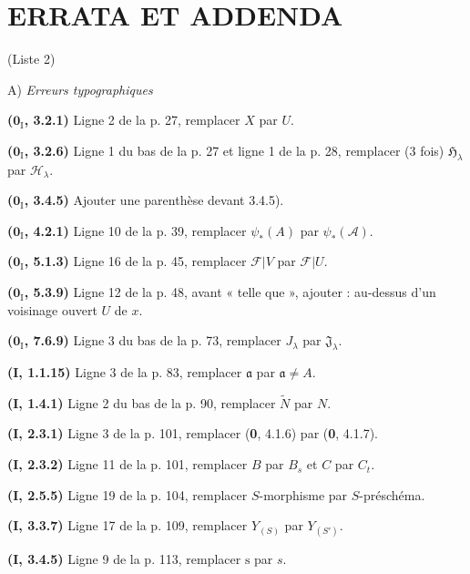 \clearpage
{}
\thispagestyle{empty}
\null
\clearpage

\section*{ERRATA ET ADDENDA}
\begin{center}
(Liste 2)

\medskip
A) \emph{Erreurs typographiques}
\end{center}

\noindent\textbf{($\mathbf{0}_{\mathrm I}$, 3.2.1)} Ligne 2 de la p. 27, remplacer $X$
par $U$.

\noindent\textbf{($\mathbf{0}_{\mathrm I}$, 3.2.6)} Ligne 1 du bas de la p. 27 et ligne
1 de la p. 28, remplacer (3 fois) $\mathfrak H_\lambda$ par
$\mathscr H_\lambda$.

\noindent\textbf{($\mathbf{0}_{\mathrm I}$, 3.4.5)} Ajouter une parenthèse devant
3.4.5).

\noindent\textbf{($\mathbf{0}_{\mathrm I}$, 4.2.1)} Ligne 10 de la p. 39, remplacer
$\psi_*(A)$ par $\psi_*(\mathscr A)$.

\noindent\textbf{($\mathbf{0}_{\mathrm I}$, 5.1.3)} Ligne 16 de la p. 45, remplacer
$\mathscr F|V$ par $\mathscr F|U$.

\noindent\textbf{($\mathbf{0}_{\mathrm I}$, 5.3.9)} Ligne 12 de la p. 48, avant
« telle que », ajouter : au-dessus d'un voisinage ouvert $U$ de $x$.

\noindent\textbf{($\mathbf{0}_{\mathrm I}$, 7.6.9)} Ligne 3 du bas de la p. 73,
remplacer $J_\lambda$ par $\mathfrak J_\lambda$.

\noindent\textbf{(I, 1.1.15)} Ligne 3 de la p. 83, remplacer $\mathfrak a$ par
$\mathfrak a\ne A$.

\noindent\textbf{(I, 1.4.1)} Ligne 2 du bas de la p. 90, remplacer
$\widetilde N$ par $N$.

\noindent\textbf{(I, 2.3.1)} Ligne 3 de la p. 101, remplacer (\textbf{0}, 4.1.6)
par (\textbf{0}, 4.1.7).

\noindent\textbf{(I, 2.3.2)} Ligne 11 de la p. 101, remplacer $B$ par $B_s$ et
$C$ par $C_t$.

\noindent\textbf{(I, 2.5.5)} Ligne 19 de la p. 104, remplacer $S$-morphisme
par $S$-préschéma.

\noindent\textbf{(I, 3.3.7)} Ligne 17 de la p. 109, remplacer $Y_{(S)}$ par
$Y_{(S')}$.

\noindent\textbf{(I, 3.4.5)} Ligne 9 de la p. 113, remplacer $\mathrm s$ par
$s$.

